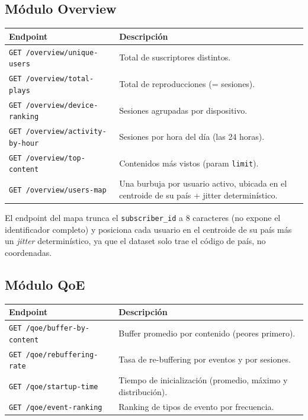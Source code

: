 \documentclass[12pt, letterpaper]{article}
\newcommand{\code}[1]{\texttt{#1}}
\begin{document}
\subsection{Módulo Overview}
\begin{center}
\begin{tabular}{@{}lL{7.5cm}@{}}
\toprule
\textbf{Endpoint} & \textbf{Descripción} \\
\midrule
\code{GET /overview/unique-users} & Total de suscriptores distintos. \\
\code{GET /overview/total-plays} & Total de reproducciones (= sesiones). \\
\code{GET /overview/device-ranking} & Sesiones agrupadas por dispositivo. \\
\code{GET /overview/activity-by-hour} & Sesiones por hora del día (las 24 horas). \\
\code{GET /overview/top-content} & Contenidos más vistos (param \code{limit}). \\
\code{GET /overview/users-map} & Una burbuja por usuario activo, ubicada en el centroide de su país + jitter determinístico. \\
\bottomrule
\end{tabular}
\end{center}

El endpoint del mapa trunca el \code{subscriber\_id} a 8 caracteres (no expone
el identificador completo) y posiciona cada usuario en el centroide de su país
más un \emph{jitter} determinístico, ya que el dataset solo trae el código de
país, no coordenadas.

\subsection{Módulo QoE}
\begin{center}
\begin{tabular}{@{}lL{7.5cm}@{}}
\toprule
\textbf{Endpoint} & \textbf{Descripción} \\
\midrule
\code{GET /qoe/buffer-by-content} & Buffer promedio por contenido (peores primero). \\
\code{GET /qoe/rebuffering-rate} & Tasa de re-buffering por eventos y por sesiones. \\
\code{GET /qoe/startup-time} & Tiempo de inicialización (promedio, máximo y distribución). \\
\code{GET /qoe/event-ranking} & Ranking de tipos de evento por frecuencia. \\
\bottomrule
\end{tabular}
\end{center}
\end{document}
